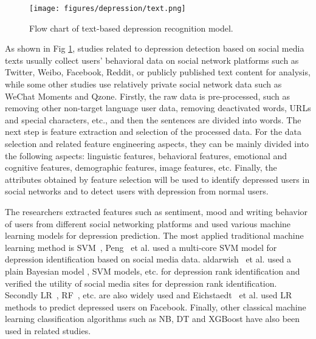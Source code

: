 
\begin{figure}[tbp]
	\centering	
	\label{fig_hard_case1}\texttt{[image: figures/depression/text.png]}		
	\caption{
	Flow chart of text-based depression recognition model.
	}
	\label{text}
\end{figure}

As shown in Fig \ref{text}, studies related to depression detection based on social media texts usually collect users' behavioral data on social network platforms such as Twitter, Weibo, Facebook, Reddit, or publicly published text content for analysis, while some other studies use relatively private social network data such as WeChat Moments and Qzone. Firstly, the raw data is pre-processed, such as removing other non-target language user data, removing deactivated words, URLs and special characters, etc., and then the sentences are divided into words. The next step is feature extraction and selection of the processed data. For the data selection and related feature engineering aspects, they can be mainly divided into the following aspects: linguistic features, behavioral features, emotional and cognitive features, demographic features, image features, etc. Finally, the attributes obtained by feature selection will be used to identify depressed users in social networks and to detect users with depression from normal users.

The researchers extracted features such as sentiment, mood and writing behavior of users from different social networking platforms and used various machine learning models for depression prediction.
The most applied traditional machine learning method is SVM~\cite{shing2018expert,smys2021analysis}, Peng~\cite{peng2019multi} et al. used a multi-core SVM model for depression identification based on social media data. aldarwish~\cite{aldarwish2017predicting} et al. used a plain Bayesian model , SVM models, etc. for depression rank identification and verified the utility of social media sites for depression rank identification. Secondly LR~\cite{eichstaedt2018facebook}, RF~\cite{tate2020predicting,kwakernaak2020using}, etc. are also widely used and Eichstaedt~\cite{eichstaedt2018facebook} et al. used LR methods to predict depressed users on Facebook. Finally, other classical machine learning classification algorithms such as NB, DT and XGBoost have also been used in related studies.

